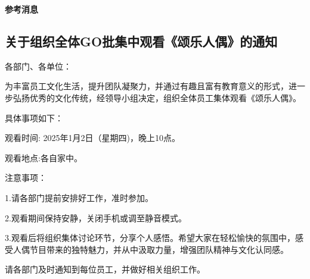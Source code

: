 \documentclass[letterpaper, 12pt]{article}
\begin{document}
\vspace{4mm}
\centerline{\huge\textbf{参考消息}}
\begin{multicols}{2}
\section{关于组织全体GO批集中观看《颂乐人偶》的通知}
各部门、各单位：

为丰富员工文化生活，提升团队凝聚力，并通过有趣且富有教育意义的形式，进一步弘扬优秀的文化传统，经领导小组决定，组织全体员工集体观看《颂乐人偶》。

具体事项如下：

观看时间: 2025年1月2日（星期四)，晚上10点。

观看地点:各自家中。

注意事项：

1.请各部门提前安排好工作，准时参加。

2.观看期间保持安静，关闭手机或调至静音模式。

3.观看后将组织集体讨论环节，分享个人感悟。希望大家在轻松愉快的氛围中，感受人偶节目带来的独特魅力，并从中汲取力量，增强团队精神与文化认同感。

请各部门及时通知到每位员工，并做好相关组织工作。
\end{multicols} 
\end{document}

